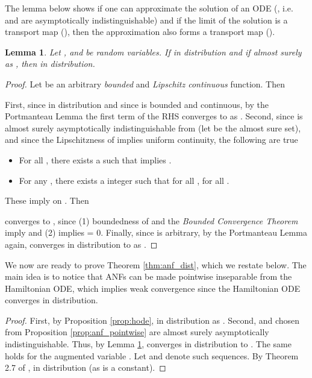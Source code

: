 \documentclass{article}
\newtheorem{lemma}{Lemma}
\begin{document}
The lemma below shows if one can approximate the solution of an ODE (, i.e.  and  are asymptotically indistinguishable) and if the limit of the solution is a transport map (), then the approximation also forms a transport map (). 
\begin{lemma}
\label{lem:conv_indistinguishable}
Let ,  and  be random variables. 
If  in distribution and if  almost surely as , then  in distribution. 
\end{lemma}
\begin{proof}
Let  be an arbitrary \emph{bounded} and \emph{Lipschitz continuous} function. 
Then 


First, since  in distribution and since  is bounded and continuous, by the Portmanteau Lemma the first term of the RHS converges to  as . 
Second,
since  is almost surely asymptotically indistinguishable from  (let  be the almost sure set),
and since the Lipschitzness of  implies uniform continuity, the following are true
\begin{itemize}
    \item For all , there exists a  such that  implies .
    \item For any , there exists a integer  such that for all ,  for all . 
\end{itemize}
These imply  on .
Then

converges to , since (1)
boundedness of  and the \emph{Bounded Convergence Theorem} imply  and (2)  implies  = 0. 
Finally, since  is arbitrary,
by the Portmanteau Lemma again,  converges in distribution to  as . 
\end{proof}


We now are ready to prove Theorem \ref{thm:anf_dist}, which we restate below.
The main idea is to notice that ANFs can be made pointwise inseparable from the Hamiltonian ODE, which implies weak convergence since the Hamiltonian ODE converges in distribution. 
\anfdist*
\begin{proof}
First, by Proposition \ref{prop:hode},  in distribution as . 
Second,  and  chosen from Proposition \ref{prop:anf_pointwise} are almost surely asymptotically indistinguishable.
Thus, by Lemma \ref{lem:conv_indistinguishable},  converges in distribution to .
The same holds for the augmented variable . 
Let  and  denote such sequences. 
By Theorem 2.7 of \citet{van2000asymptotic},  in distribution (as  is a constant).
\end{proof}
\end{document}
